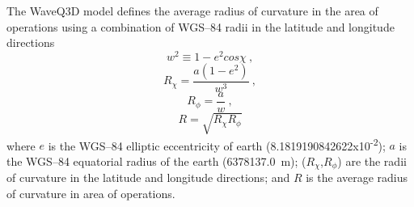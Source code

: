 \documentclass{ws-jca}
\begin{document}
The WaveQ3D model defines the average radius of curvature in the area of
operations using a combination of WGS--84 radii in the latitude and
longitude directions\cite{Jones1986}
\begin{equation}
	w^2 \equiv 1 - e^2 cos\chi \:,
	\label{eq:w^2}
\end{equation}
\begin{equation}
	R_\chi = \frac{a(1-e^2)}{w^3} \:,
	\label{eq:R_chi}
\end{equation}
\begin{equation}
	R_\phi = \frac{a}{w} \:,
	\label{eq:R_phi}
\end{equation}
\begin{equation}
	R = \sqrt{ R_\chi R_\phi }
	\label{eq:Rtotal}
\end{equation}
where 
$e$ is the WGS--84 elliptic eccentricity of earth (8.1819190842622x10\textsuperscript{-2});
$a$ is the WGS--84 equatorial radius of the earth (6378137.0~m);
(\(R_\chi\),\(R_\phi\)) are the radii of curvature in the latitude and longitude directions; 
and $R$ is the average radius of curvature in area of operations.  
\end{document}
